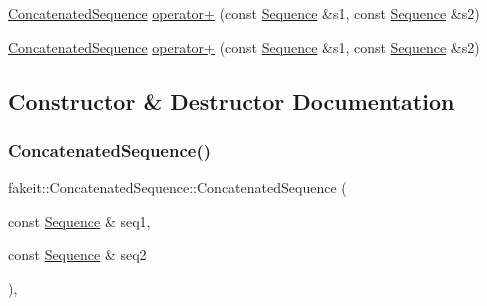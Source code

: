 \begin{DoxyCompactItemize}
\item 
\mbox{\hyperlink{classfakeit_1_1ConcatenatedSequence}{Concatenated\+Sequence}} \mbox{\hyperlink{classfakeit_1_1ConcatenatedSequence_adb09b1b1e32428d0c2f46bd549141cdd}{operator+}} (const \mbox{\hyperlink{classfakeit_1_1Sequence}{Sequence}} \&s1, const \mbox{\hyperlink{classfakeit_1_1Sequence}{Sequence}} \&s2)
\item 
\mbox{\hyperlink{classfakeit_1_1ConcatenatedSequence}{Concatenated\+Sequence}} \mbox{\hyperlink{classfakeit_1_1ConcatenatedSequence_adb09b1b1e32428d0c2f46bd549141cdd}{operator+}} (const \mbox{\hyperlink{classfakeit_1_1Sequence}{Sequence}} \&s1, const \mbox{\hyperlink{classfakeit_1_1Sequence}{Sequence}} \&s2)
\end{DoxyCompactItemize}


\subsection{Constructor \& Destructor Documentation}
\mbox{\label{classfakeit_1_1ConcatenatedSequence_abd7ca3783b69358f0ff4c15b970b01d0}} 
\subsubsection{\texorpdfstring{ConcatenatedSequence()}{ConcatenatedSequence()}\hspace{0.1cm}{\footnotesize\ttfamily [1/9]}}
{\footnotesize\ttfamily fakeit\+::\+Concatenated\+Sequence\+::\+Concatenated\+Sequence (\begin{DoxyParamCaption}\item[{const \mbox{\hyperlink{classfakeit_1_1Sequence}{Sequence}} \&}]{seq1,  }\item[{const \mbox{\hyperlink{classfakeit_1_1Sequence}{Sequence}} \&}]{seq2 }\end{DoxyParamCaption})\hspace{0.3cm}{\ttfamily [inline]}, {\ttfamily [protected]}}

\mbox{\label{classfakeit_1_1ConcatenatedSequence_a22346ae8c3c2af91f26144338750be25}} 

